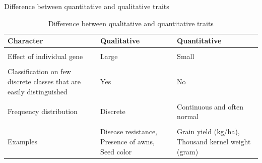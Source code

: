 \documentclass[11pt,ignorenonframetext,aspectratio=169]{beamer}
\begin{document}
\begin{frame}{Difference between quantitative and qualitative traits}
\protect\hypertarget{difference-between-quantitative-and-qualitative-traits}{}
\begin{table}

\caption{\label{tab:quant-qual-difference}Difference between qualitative and quantitative traits}
\centering
\fontsize{8}{10}\selectfont
\begin{tabular}[t]{>{\raggedright\arraybackslash}p{18em}>{\raggedright\arraybackslash}p{16em}>{\raggedright\arraybackslash}p{16em}}
\toprule
Character & Qualitative & Quantitative\\
\midrule
\cellcolor{gray!6}{Number of gene and loci controlling the character} & \cellcolor{gray!6}{Few, one (mongenic) or few major genes (oligogenic)} & \cellcolor{gray!6}{Many, polygenes (polygeneic)}\\
Effect of individual gene & Large & Small\\
\cellcolor{gray!6}{Follow mendel's law} & \cellcolor{gray!6}{Yes} & \cellcolor{gray!6}{Yes}\\
Classification on few discrete classes that are easily distinguished & Yes & No\\
\cellcolor{gray!6}{Measurement of the character} & \cellcolor{gray!6}{Observation} & \cellcolor{gray!6}{Measured in metric units}\\
\addlinespace
Frequency distribution & Discrete & Continuous and often normal\\
\cellcolor{gray!6}{Effect of environment on expression of character} & \cellcolor{gray!6}{No or little affected} & \cellcolor{gray!6}{Largely affected}\\
Examples & Disease resistance, Presence of awns, Seed color & Grain yield (kg/ha), Thousand kernel weight (gram)\\
\bottomrule
\end{tabular}
\end{table}
\end{frame}
\end{document}
